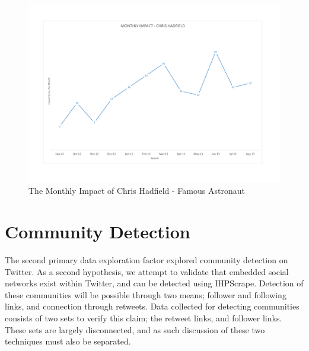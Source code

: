 \begin{figure}[h!]
\begin{center}
\centering
\includegraphics[width=500px]{Images/chris_hadfield_monthly_impact.pdf}
\caption{The Monthly Impact of Chris Hadfield - Famous Astronaut}
\label{fig:hadfield}
\end{center}
\end{figure}

\section{Community Detection}

The second primary data exploration factor explored community detection on Twitter. As a second hypothesis, we attempt to validate that embedded social networks exist within Twitter, and can be detected using IHPScrape. Detection of these communities will be possible through two means; follower and following links, and connection through retweets. Data collected for detecting communities consists of two sets to verify this claim; the retweet links, and follower links. These sets are largely disconnected, and as such discussion of these two techniques must also be separated.  
% 
% 



